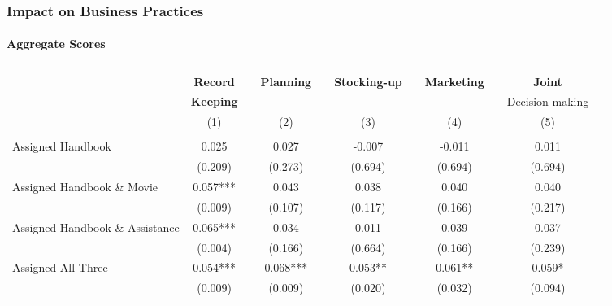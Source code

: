 \documentclass[10pt]{beamer}
\begin{document}
\begin{frame}
\frametitle{Impact on Business Practices}
\framesubtitle{Aggregate Scores}
{\tiny{\begin{table}[t]
	\begin{tabular}{l*{10}{c}}
		\hline \hline
		\\
			&\textbf{Record}			&&\textbf{Planning}			&&\textbf{Stocking-up}	&&\textbf{Marketing} && \textbf{Joint} \\
&\textbf{Keeping}                       &&                        &&	                   &&	 && Decision-making \\
					&(1)					&&(2)						&&(3) 						&&(4) && (5)\\
			\cline{2-2}					\cline{4-4}					\cline{6-6}			\cline{8-8} \cline{10-10}  \\


Assigned Handbook 			&                    0.025   &&	          0.027   	 &&           -0.007   	 &&          -0.011   	  &&         0.011
      \\
         							&               (0.209)   	   &&      (0.273)   	&&         (0.694)   	     &&    (0.694)   	&&         (0.694)
    \\

         							
Assigned Handbook \& Movie 	&                     0.057*** 	 &&          0.043  	   &&       0.038  	    &&       0.040    &&        0.040        \\
          							&              (0.009)   &&	         (0.107)   	  &&       (0.117)   	  &&       (0.166)   	 &&        (0.217)         \\

         							
Assigned Handbook \& Assistance 	&              0.065*** 	  &&         0.034   	&&           0.011   	 &&           0.039 	       &&      0.037    \\
         							&           (0.004)   	  &&       (0.166)   &&	         (0.664)   && 	         (0.166)   	  &&       (0.239)    \\

         							
Assigned All Three          	&                0.054***	  &&         0.068***  	 &&          0.053**  	    &&       0.061**	   &&        0.059*          \\
									&             (0.009)    &&	         (0.009)   	&&         (0.020)   	  &&       (0.032)   &&	         (0.094)           \\


\end{tabular}
\end{table}}}
\end{frame}
\end{document}
